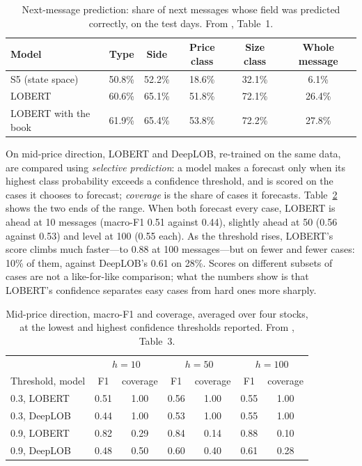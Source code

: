 \begin{table}[!htbp]
\centering\footnotesize
\caption{Next-message prediction: share of next messages whose field was predicted correctly, on the test days. From
\citet{linna2025lobert}, Table~1.}
\label{tab:lobert-next}
\begin{tabular}{lccccc}
\toprule
Model & Type & Side & Price class & Size class & Whole message \\
\midrule
S5 (state space) & 50.8\% & 52.2\% & 18.6\% & 32.1\% & 6.1\% \\
LOBERT & 60.6\% & 65.1\% & 51.8\% & 72.1\% & 26.4\% \\
LOBERT with the book & 61.9\% & 65.4\% & 53.8\% & 72.2\% & 27.8\% \\
\bottomrule
\end{tabular}
\end{table}

On mid-price direction, LOBERT and DeepLOB, re-trained on the same data, are compared using \emph{selective prediction}:
a model makes a forecast only when its highest class probability exceeds a confidence threshold, and is scored on the
cases it chooses to forecast; \emph{coverage} is the share of cases it forecasts. Table~\ref{tab:lobert-mid} shows the
two ends of the range. When both forecast every case, LOBERT is ahead at 10 messages (macro-F1 0.51 against 0.44),
slightly ahead at 50 (0.56 against 0.53) and level at 100 (0.55 each). As the threshold rises, LOBERT's score climbs
much faster---to 0.88 at 100 messages---but on fewer and fewer cases: 10\% of them, against DeepLOB's 0.61 on 28\%.
Scores on different subsets of cases are not a like-for-like comparison; what the numbers show is that LOBERT's
confidence separates easy cases from hard ones more sharply.

\begin{table}[!htbp]
\centering\footnotesize
\caption{Mid-price direction, macro-F1 and coverage, averaged over four stocks, at the lowest and highest confidence
thresholds reported. From \citet{linna2025lobert}, Table~3.}
\label{tab:lobert-mid}
\begin{tabular}{lcccccc}
\toprule
& \multicolumn{2}{c}{$h = 10$} & \multicolumn{2}{c}{$h = 50$} & \multicolumn{2}{c}{$h = 100$} \\
Threshold, model & F1 & coverage & F1 & coverage & F1 & coverage \\
\midrule
0.3, LOBERT & 0.51 & 1.00 & 0.56 & 1.00 & 0.55 & 1.00 \\
0.3, DeepLOB & 0.44 & 1.00 & 0.53 & 1.00 & 0.55 & 1.00 \\
0.9, LOBERT & 0.82 & 0.29 & 0.84 & 0.14 & 0.88 & 0.10 \\
0.9, DeepLOB & 0.48 & 0.50 & 0.60 & 0.40 & 0.61 & 0.28 \\
\bottomrule
\end{tabular}
\end{table}


